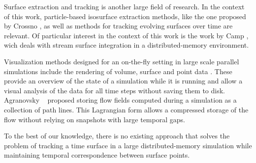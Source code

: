 %
Surface extraction and tracking is another large field of research.
%
In the context of this work, particle-based isosurface extraction methods, like
the one proposed by Crossno \etal \cite{Crossno1997}, as well as methods for
tracking evolving surfaces over time \cite{Krishnan2009,Buerger2009,Berres2015}
are relevant.
%
Of particular interest in the context of this work is the work by Camp \etal
\cite{Camp2012}, wich deals with stream surface integration in a
distributed-memory environment.
%

%
Visualization methods designed for an on-the-fly setting in large scale parallel
simulations include the rendering of volume, surface and point data
\cite{Akiba2007,Yu2010}.
%
These provide an overview of the state of a simulation while it is running and
allow a visual analysis of the data for all time steps without saving them to
disk.
%
Agranovsky \etal~\cite{Agranovsky2014} proposed storing flow fields computed
during a simulation as a collection of path lines.
%
This Lagrangian form allows a compressed storage of the flow without relying on
snapshots with large temporal gaps.
%

%
To the best of our knowledge, there is no existing approach that solves the
problem of tracking a time surface in a large distributed-memory simulation
while maintaining temporal correspondence between surface points.
%
